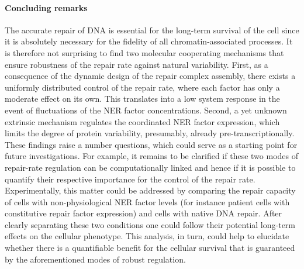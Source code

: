 %
%
%
%

\paragraph{Concluding remarks}
The accurate repair of DNA is essential for the long-term survival of the cell since it is absolutely necessary for the fidelity of all chromatin-associated processes. It is therefore not surprising to find two molecular cooperating mechanisms that ensure robustness of the repair rate against natural variability. First, as a consequence of the dynamic design of the repair complex assembly, there exists a uniformly distributed control of the repair rate, where each factor has only a moderate effect on its own. This translates into a low system response in the event of fluctuations of the NER factor concentrations. Second, a yet unknown extrinsic mechanism regulates the coordinated NER factor expression, which limits the degree of protein variability, presumably, already pre-transcriptionally.\\  
These findings raise a number questions, which could serve as a starting point for future investigations. For example, it remains to be clarified if these two modes of repair-rate regulation can be computationally linked and hence if it is possible to quantify their respective importance for the control of the repair rate. Experimentally, this matter could be addressed by comparing the repair capacity of cells with non-physiological NER factor levels (for instance patient cells with constitutive repair factor expression) and cells with native DNA repair. After clearly separating these two conditions one could follow their potential long-term effects on the cellular phenotype. This analysis, in turn, could help to elucidate whether there is a quantifiable benefit for the cellular survival that is guaranteed by the aforementioned modes of robust regulation.  

 




